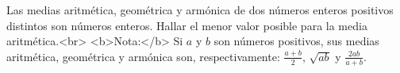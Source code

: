 Las medias aritmética, geométrica y armónica de dos números enteros positivos distintos son números enteros. Hallar el menor valor posible para la media aritmética.<br>
<b>Nota:</b> Si $a$ y $b$ son números positivos, sus medias aritmética, geométrica y armónica son, respectivamente: $\frac{a+b}{2}$, $\sqrt{ab}$ y $\frac{2ab}{a+b}$.

